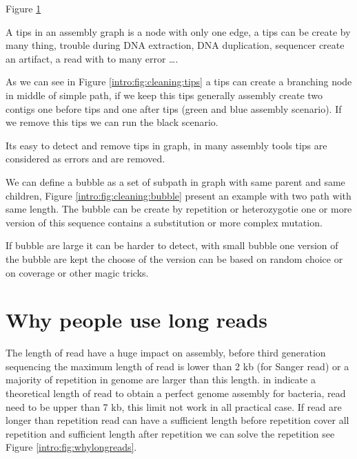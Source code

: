 \documentclass[./main.tex]{subfiles}
\begin{document}
Figure \ref{intro:fig:cleaning}

\begin{figure}[ht]
    \caption{}
    \label{intro:fig:cleaning}
\end{figure}

A tips in an assembly graph is a node with only one edge, a tips can be create by many thing, trouble during DNA extraction, DNA duplication, sequencer create an artifact, a read with to many error ….

As we can see in Figure \ref{intro:fig:cleaning:tips} a tips can create a branching node in middle of simple path, if we keep this tips generally assembly create two contigs one before tips and one after tips (green and blue assembly scenario). If we remove this tips we can run the black scenario.

Its easy to detect and remove tips in graph, in many assembly tools tips are considered as errors and are removed.

We can define a bubble as a set of subpath in graph with same parent and same children, Figure \ref{intro:fig:cleaning:bubble} present an example with two path with same length. The bubble can be create by repetition or heterozygotie one or more version of this sequence contains a substitution or more complex mutation.

If bubble are large it can be harder to detect, with small bubble one version of the bubble are kept the choose of the version can be based on random choice or on coverage or other magic tricks.

\section{Why people use long reads}

The length of read have a huge impact on assembly, before third generation sequencing the maximum length of read is lower than 2 kb (for Sanger read) or a majority of repetition in genome are larger than this length. \citeauthor{one_chromosome_one_contig} in \cite{one_chromosome_one_contig} indicate a theoretical length of read to obtain a perfect genome assembly for bacteria, read need to be upper than 7 kb, this limit not work in all practical case. If read are longer than repetition read can have a sufficient length before repetition cover all repetition and sufficient length after repetition we can solve the repetition see Figure \ref{intro:fig:whylongreads}.
\end{document}
